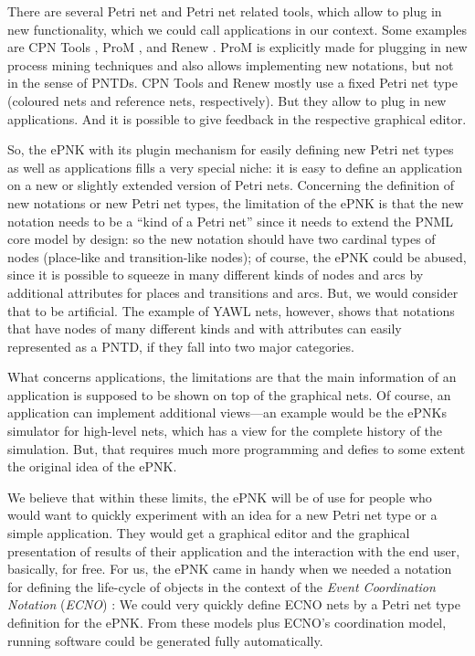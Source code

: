 \documentclass[a4paper]{llncs}
\begin{document}
There are several Petri net and Petri net related tools, which allow to plug in
new functionality, which we could call applications in our context. Some examples are
CPN Tools \cite{CPNHome}, ProM \cite{PRoMURL}, and Renew \cite{DBLP:conf/apn/KummerWDSKMRV04}.
ProM is explicitly made for plugging in new process mining techniques and also
allows implementing new notations, but not in the sense of PNTDs. CPN Tools and
Renew mostly use a fixed Petri net type (coloured nets and reference nets, respectively).
But they allow to plug in new applications. And it is possible to give feedback
in the respective graphical editor.

So, the ePNK with its plugin mechanism for easily defining new Petri net types
as well as applications fills a very special niche: it is easy to define
an application on a new or slightly extended version of Petri nets. Concerning
the definition of new notations or new Petri net types, the limitation of
the ePNK is that the new notation needs to be a ``kind of a Petri net'' since
it needs to extend the PNML core model by design:
so the new notation should have two cardinal types of nodes (place-like and transition-like
nodes); of course, the ePNK could be
abused, since it is possible to squeeze in many different kinds of nodes and arcs
by additional attributes for places and transitions and arcs. But, we would 
consider that to be artificial. The example of YAWL nets, however, shows that notations
that have nodes of many different kinds and with attributes can easily represented
as a PNTD, if they fall into two major categories.

What concerns applications, the limitations are that the main information of
an application is supposed to be shown on top of the graphical nets. Of course,
an application can implement additional views---an example would be the
ePNKs simulator for high-level nets, which has a view for the complete history of
the simulation. But, that requires much more programming and defies to some
extent the original idea of the ePNK.

We believe that within these limits, the ePNK will be of use for people
who would want to quickly experiment with an idea for a new Petri net type
or a simple application. They would get a graphical editor and the graphical
presentation of results of their application and the interaction with the end user,
basically, for free.
For us, the ePNK came in handy when we needed a notation
for defining the life-cycle of objects in the context of the \emph{Event Coordination
Notation} (\emph{ECNO}) \cite{Kin14a}: We could very quickly define ECNO nets by a
Petri net type definition for the ePNK. From these models plus ECNO's coordination model,
running software could be generated fully automatically. 
\end{document}
